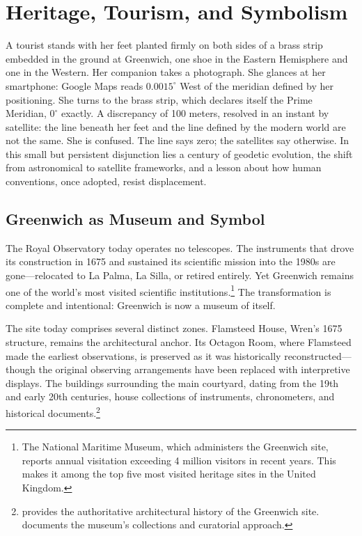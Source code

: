 \chapter{Heritage, Tourism, and Symbolism}
\label{ch:heritage-tourism-symbolism}

A tourist stands with her feet planted firmly on both sides of a brass strip embedded in the ground at Greenwich, one shoe in the Eastern Hemisphere and one in the Western. Her companion takes a photograph. She glances at her smartphone: Google Maps reads $0.0015^{\circ}$ West of the meridian defined by her positioning. She turns to the brass strip, which declares itself the Prime Meridian, $0^{\circ}$ exactly. A discrepancy of 100 meters, resolved in an instant by satellite: the line beneath her feet and the line defined by the modern world are not the same. She is confused. The line says zero; the satellites say otherwise. In this small but persistent disjunction lies a century of geodetic evolution, the shift from astronomical to satellite frameworks, and a lesson about how human conventions, once adopted, resist displacement.

\section{Greenwich as Museum and Symbol}

The Royal Observatory today operates no telescopes. The instruments that drove its construction in 1675 and sustained its scientific mission into the 1980s are gone---relocated to La Palma, La Silla, or retired entirely. Yet Greenwich remains one of the world's most visited scientific institutions.\footnote{The National Maritime Museum, which administers the Greenwich site, reports annual visitation exceeding 4 million visitors in recent years. This makes it among the top five most visited heritage sites in the United Kingdom.} The transformation is complete and intentional: Greenwich is now a museum of itself.

The site today comprises several distinct zones. Flamsteed House, Wren's 1675 structure, remains the architectural anchor. Its Octagon Room, where Flamsteed made the earliest observations, is preserved as it was historically reconstructed---though the original observing arrangements have been replaced with interpretive displays. The buildings surrounding the main courtyard, dating from the 19th and early 20th centuries, house collections of instruments, chronometers, and historical documents.\footnote{\textcite{Howse1980} provides the authoritative architectural history of the Greenwich site. \textcite{NMM2010} documents the museum's collections and curatorial approach.}

